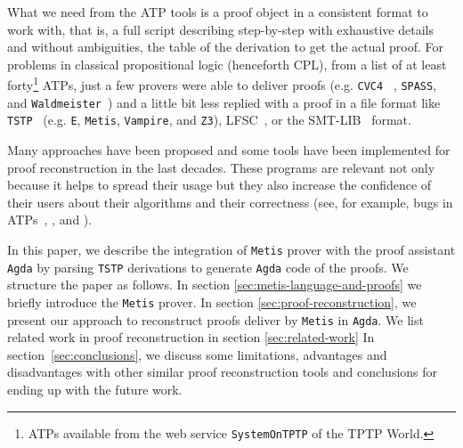 \documentclass[main.tex]{subfiles}
\begin{document}
What we need from the ATP tools is a proof object in a consistent format
to work with, that is, a full script describing step-by-step with
exhaustive details and without ambiguities, the table of the derivation
to get the actual proof. For problems in classical propositional logic
(henceforth CPL), from a list of at least forty\footnote{ATPs available
from the web service \texttt{SystemOnTPTP} of the TPTP World.} ATPs, just
a few provers were able to deliver proofs (e.g. \verb!CVC4!~
\cite{Barrett2011}, \verb!SPASS!, and
\verb!Waldmeister!~\cite{hillenbrand1997})
and a little bit less replied with a proof in a
file format like \verb!TSTP!~\cite{sutcliffe2004tstp} (e.g. \verb!E!, \verb!Metis!,
\verb!Vampire!, and \verb!Z3!), LFSC~\cite{Stump2008}, or the
SMT-LIB~\cite{Bohme2011} format.

Many approaches have been proposed and some tools have been implemented
for proof reconstruction in the last decades. These programs are relevant
not only because it helps to spread their usage but they also increase
the confidence of their users about their algorithms and their
correctness (see, for example, bugs in ATPs~\cite{Keller2013},
\cite{Bohme2011}, \cite{Fleury2014} and \cite{Kanso2012}).

In this paper, we describe the integration of \verb!Metis! prover with the
proof assistant \verb!Agda! by parsing \verb!TSTP! derivations to generate
\verb!Agda! code of the proofs. We structure the paper as follows.
In section \ref{sec:metis-language-and-proofs} we briefly introduce
the \verb!Metis! prover. In section \ref{sec:proof-reconstruction}, we
present our approach to reconstruct proofs deliver by \verb!Metis! in
\verb!Agda!.
We list related work in proof reconstruction in section \ref{sec:related-work}
In section~\ref{sec:conclusions}, we discuss some limitations, advantages
and disadvantages with other similar proof reconstruction tools and
conclusions for ending up with the future work.
\end{document}
